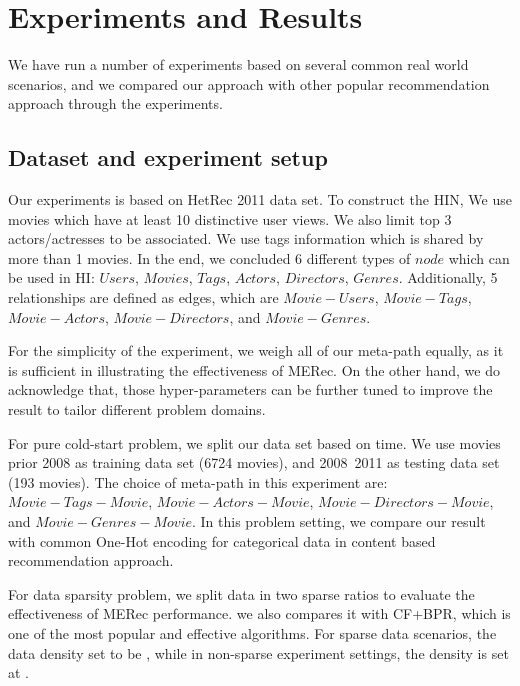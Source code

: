 \section{Experiments and Results}\label{4_experiment}
We have run a number of experiments based on several common real world scenarios, and we compared our approach with other popular recommendation approach through the experiments.
\subsection{Dataset and experiment setup}
Our experiments is based on HetRec 2011 \cite{CantadorRecSys2011} data set. To construct the HIN, We use movies which have at least 10 distinctive user views. We also limit top 3 actors/actresses to be associated. We use tags information which is shared by more than 1 movies. In the end, we concluded 6 different types of $node$ which can be used in HI: $Users$, $Movies$, $Tags$, $Actors$, $Directors$, $Genres$.
Additionally, 5 relationships are defined as edges, which are $Movie-Users$, $Movie-Tags$, $Movie-Actors$, $Movie-Directors$, and $Movie-Genres$.

For the simplicity of the experiment, we weigh all of our meta-path equally, as it is sufficient in illustrating the effectiveness of MERec. On the other hand, we do acknowledge that, those hyper-parameters can be further tuned to improve the result to tailor different problem domains. 

For pure cold-start problem, we split our data set based on time. We use movies prior 2008 as training data set (6724 movies), and 2008~2011 as testing data set (193 movies). The choice of meta-path in this experiment are: $Movie-Tags-Movie$, $Movie-Actors-Movie$, $Movie-Directors-Movie$, and $Movie-Genres-Movie$. In this problem setting, we compare our result with common One-Hot encoding for categorical data in content based recommendation approach.

For data sparsity problem, we split data in two sparse ratios to evaluate the effectiveness of MERec performance. we also compares it with CF+BPR, which is one of the most popular and effective algorithms. For sparse data scenarios, the data density set to be , while in non-sparse experiment settings, the density is set at .

